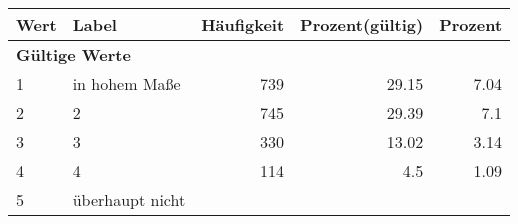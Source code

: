      \begin{longtable}{lXrrr}
     \toprule
     \textbf{Wert} & \textbf{Label} & \textbf{Häufigkeit} & \textbf{Prozent(gültig)} & \textbf{Prozent} \\
     \endhead
     \midrule
     \multicolumn{5}{l}{\textbf{Gültige Werte}}\\

     1 &
     \multicolumn{1}{X}{ in hohem Maße   } &


       \num{739} &
       \num[round-mode=places,round-precision=2]{29.15} &
         \num[round-mode=places,round-precision=2]{7.04} \\

     2 &
     \multicolumn{1}{X}{ 2   } &


       \num{745} &
       \num[round-mode=places,round-precision=2]{29.39} &
         \num[round-mode=places,round-precision=2]{7.1} \\

     3 &
     \multicolumn{1}{X}{ 3   } &


       \num{330} &
       \num[round-mode=places,round-precision=2]{13.02} &
         \num[round-mode=places,round-precision=2]{3.14} \\

     4 &
     \multicolumn{1}{X}{ 4   } &


       \num{114} &
       \num[round-mode=places,round-precision=2]{4.5} &
         \num[round-mode=places,round-precision=2]{1.09} \\

     5 &
     \multicolumn{1}{X}{ überhaupt nicht   } &



\end{longtable}

